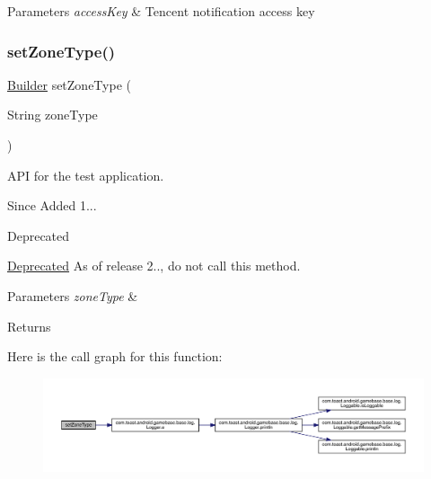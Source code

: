 \begin{DoxyParams}{Parameters}
{\em access\+Key} & Tencent notification access key \\
\hline
\end{DoxyParams}
\mbox{\label{classcom_1_1toast_1_1android_1_1gamebase_1_1_gamebase_configuration_1_1_builder_a66db0aa4dc8c164fd7d93cd20e0af13e}} 
\subsubsection{\texorpdfstring{set\+Zone\+Type()}{setZoneType()}}
{\footnotesize\ttfamily \hyperlink{classcom_1_1toast_1_1android_1_1gamebase_1_1_gamebase_configuration_1_1_builder}{Builder} set\+Zone\+Type (\begin{DoxyParamCaption}\item[{String}]{zone\+Type }\end{DoxyParamCaption})}



A\+PI for the test application. 

\begin{DoxySince}{Since}
Added 1... 
\end{DoxySince}
\begin{DoxyRefDesc}{Deprecated}
\item[\hyperlink{deprecated__deprecated000011}{Deprecated}]As of release 2.., do not call this method. \end{DoxyRefDesc}

\begin{DoxyParams}{Parameters}
{\em zone\+Type} & \\
\hline
\end{DoxyParams}
\begin{DoxyReturn}{Returns}

\end{DoxyReturn}
Here is the call graph for this function\+:
\nopagebreak
\begin{figure}[H]
\begin{center}
\leavevmode
\includegraphics[width=350pt]{classcom_1_1toast_1_1android_1_1gamebase_1_1_gamebase_configuration_1_1_builder_a66db0aa4dc8c164fd7d93cd20e0af13e_cgraph}
\end{center}
\end{figure}


